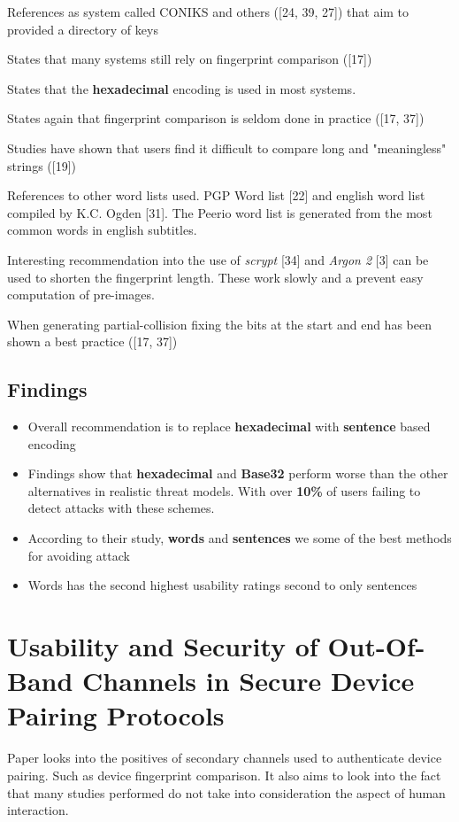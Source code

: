 References as system called CONIKS and others ([24, 39, 27]) that aim to provided a directory of keys

States that many systems still rely on fingerprint comparison ([17])

States that the \textbf{hexadecimal} encoding is used in most systems. 

States again that fingerprint comparison is seldom done in practice ([17, 37])

Studies have shown that users find it difficult to compare long and "meaningless" strings ([19])

References to other word lists used. PGP Word list [22] and english word list compiled by K.C. Ogden [31]. The Peerio word list is generated from the most common words in english subtitles.

Interesting recommendation into the use of \textit{scrypt} [34] and \textit{Argon 2} [3] can be used to shorten the fingerprint length. These work slowly and a prevent easy computation of pre-images.

When generating partial-collision fixing the bits at the start and end has been shown a best practice ([17, 37])

\subsection{Findings}
\begin{itemize}
    \item Overall recommendation is to replace \textbf{hexadecimal} with \textbf{sentence} based encoding
    \item Findings show that \textbf{hexadecimal} and \textbf{Base32} perform worse than the other alternatives in realistic threat models. With over \textbf{10\%} of users failing to detect attacks with these schemes.
    \item According to their study, \textbf{words} and \textbf{sentences} we some of the best methods for avoiding attack
    \item Words has the second highest usability ratings second to only sentences
\end{itemize}

\newpage
\section{Usability and Security of Out-Of-Band Channels in Secure Device Pairing Protocols}

Paper looks into the positives of secondary channels used to authenticate device pairing. Such as device fingerprint comparison. It also aims to look into the fact that many studies performed do not take into consideration the aspect of human interaction.

